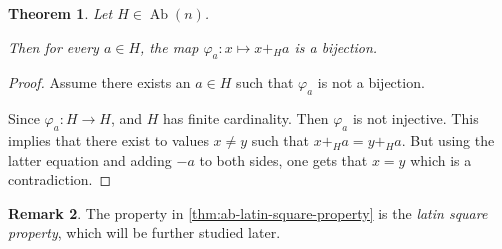 \documentclass[a4paper, 12pt, english]{article}
\theoremstyle{plain}
\newtheorem{theorem}{Theorem}[section]
\theoremstyle{definition}
\newtheorem{remark}[theorem]{Remark}
\DeclareMathOperator{\Ab}{Ab}
\begin{document}
\begin{theorem} \label{thm:ab-latin-square-property}
    Let \( H \in \Ab(n) \).

    Then for every \( a \in H \), the map \( \varphi_a: x \mapsto x +_H a \) is a bijection.
\end{theorem}
\begin{proof}
    Assume there exists an \( a \in H \) such that \( \varphi_a \) is not a bijection.
    
    Since \( \varphi_a: H \to H \), and \( H \) has finite cardinality. Then \( \varphi_a \) is not injective. This implies that there exist to values \( x \neq y \) such that \( x +_H a = y +_H a \). But using the latter equation and adding \( -a \) to both sides, one gets that \( x = y \) which is a contradiction.
\end{proof}

\begin{remark}
    The property in \autoref{thm:ab-latin-square-property} is the \emph{latin square property}, which will be further studied later.
\end{remark}
\end{document}
